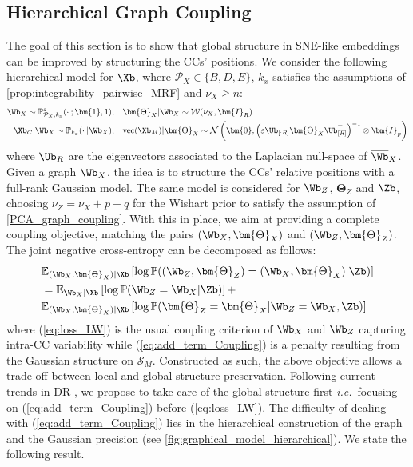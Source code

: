 \subsection{Hierarchical Graph Coupling}\label{sec:hierarchical_modelling}

The goal of this section is to show that global structure in SNE-like embeddings can be improved by structuring the CCs' positions. We consider the following hierarchical model for $\Xb$, where $\mathcal{P}_{X} \in \{B,D,E\}$, $k_x$ satisfies the assumptions of \cref{prop:integrability_pairwise_MRF} and $\nu_{X} \geq n$:
\begin{align*}
    \Wb_{X} \sim \mathbb{P}_{\mathcal{P}_X,k_x}^{\varepsilon}(\cdot \: ; \bm{1},1), &\quad \bm{\Theta}_{X} | \Wb_{X} \sim \mathcal{W}(\nu_{X}, \bm{I}_{R}) \\
    \Xb_{C} |\Wb_{X} \sim \mathbb{P}_{k_x}(\cdot \:| \Wb_{X}), &\quad \mathrm{vec}(\Xb_{M}) | \bm{\Theta}_{X} \sim \mathcal{N}\left(\bm{0}, \left(\varepsilon \Ub_{[:R]}  \bm{\Theta}_{X}\Ub^\top_{[R]}\right)^{-1} \otimes \bm{I}_p\right)
\end{align*}
where $\Ub_{R}$ are the eigenvectors associated to the Laplacian null-space of $\overline{\Wb}_{X}$. Given a graph $\Wb_{X}$, the idea is to structure the CCs' relative positions with a full-rank Gaussian model.
The same model is considered for $\Wb_{Z}$, $\bm{\Theta}_{Z}$ and $\Zb$, choosing $\nu_{Z} = \nu_{X} + p - q$ for the Wishart prior to satisfy the assumption of \cref{PCA_graph_coupling}.  With this in place, we aim at providing a complete coupling objective, matching the pairs  $(\Wb_{X},\bm{\Theta}_{X})$ and  $(\Wb_{Z},\bm{\Theta}_{Z})$. The joint negative cross-entropy can be decomposed as follows:
\begin{align}
    &\mathbb{E}_{(\Wb_{X}, \bm{\Theta}_{X})|\Xb}\left[\log \mathbb{P}((\Wb_{Z},\bm{\Theta}_{Z}) = (\Wb_{X},\bm{\Theta}_{X}) | \Zb)\right] \nonumber\\
    &= \mathbb{E}_{\Wb_{X}|\Xb}\left[\log \mathbb{P}(\Wb_{Z} = \Wb_{X} | \Zb)\right] + \label{eq:loss_LW} \\
    & \mathbb{E}_{(\Wb_{X},\bm{\Theta}_{X})|\Xb}\left[ \log \mathbb{P}(\bm{\Theta}_{Z} = \bm{\Theta}_{X}| \Wb_{Z} = \Wb_{X}, \Zb) \right] \label{eq:add_term_Coupling}
\end{align}
where (\ref{eq:loss_LW}) is the usual coupling criterion of $\Wb_X$ and $\Wb_Z$ capturing intra-CC variability while (\ref{eq:add_term_Coupling}) is a penalty resulting from the Gaussian structure on $\mathcal{S}_{M}$. Constructed as such, the above objective allows a trade-off between local and global structure preservation. Following current trends in DR \citep{kobak2021initialization}, we propose to take care of the global structure first \textit{i.e.}\ focusing on (\ref{eq:add_term_Coupling}) before (\ref{eq:loss_LW}). The difficulty of dealing with (\ref{eq:add_term_Coupling}) lies in the hierarchical construction of the graph and the Gaussian precision (see \cref{fig:graphical_model_hierarchical}). We state the following result.

